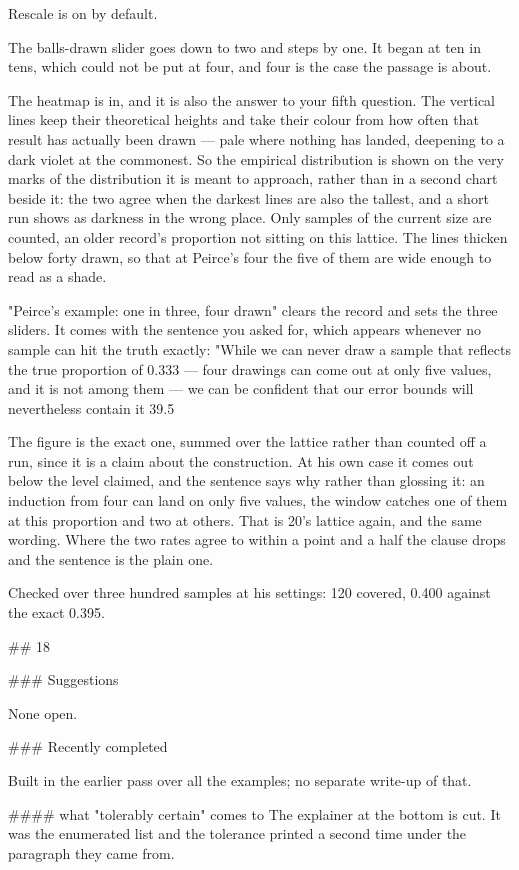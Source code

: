 Rescale is on by default.

The balls-drawn slider goes down to two and steps by one. It began at ten in
tens, which could not be put at four, and four is the case the passage is about.

The heatmap is in, and it is also the answer to your fifth question. The
vertical lines keep their theoretical heights and take their colour from how
often that result has actually been drawn — pale where nothing has landed,
deepening to a dark violet at the commonest. So the empirical distribution is
shown on the very marks of the distribution it is meant to approach, rather than
in a second chart beside it: the two agree when the darkest lines are also the
tallest, and a short run shows as darkness in the wrong place. Only samples of
the current size are counted, an older record's proportion not sitting on this
lattice. The lines thicken below forty drawn, so that at Peirce's four the five
of them are wide enough to read as a shade.

"Peirce's example: one in three, four drawn" clears the record and sets the
three sliders. It comes with the sentence you asked for, which appears whenever
no sample can hit the truth exactly: "While we can never draw a sample that
reflects the true proportion of 0.333 — four drawings can come out at only five
values, and it is not among them — we can be confident that our error bounds
will nevertheless contain it 39.5%

The figure is the exact one, summed over the lattice rather than counted off a
run, since it is a claim about the construction. At his own case it comes out
below the level claimed, and the sentence says why rather than glossing it: an
induction from four can land on only five values, the window catches one of them
at this proportion and two at others. That is 20's lattice again, and the same
wording. Where the two rates agree to within a point and a half the clause drops
and the sentence is the plain one.

Checked over three hundred samples at his settings: 120 covered, 0.400 against
the exact 0.395.


## 18

### Suggestions

None open.

### Recently completed

Built in the earlier pass over all the examples; no separate write-up of that.

#### what "tolerably certain" comes to
The explainer at the bottom is cut. It was the enumerated list and the tolerance
printed a second time under the paragraph they came from.

